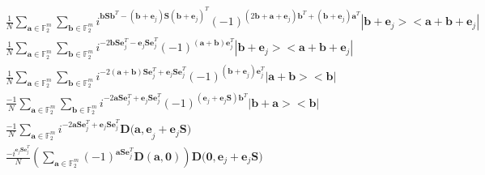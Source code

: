 \documentclass{article}
\begin{document}
\begin{enumerate}
		\begin{align}
			&\frac{1}{N}\sum_{\mathbf{a} \in \mathbb{F}^m_2}{\sum_{\mathbf{b} \in \mathbb{F}^m_2}{i^{\mathbf{b S b}^T -(\mathbf{b+e}_j)\mathbf{S}(\mathbf{b+e}_j)^T} (-1)^{(2\mathbf{b}+\mathbf{a+e}_j)\mathbf{b}^T+(\mathbf{b+e}_j)\mathbf{a}^T} |\mathbf{b+e}_j> <\mathbf{a+b+e}_j |    } }\nonumber \\
			&\frac{1}{N}\sum_{\mathbf{a} \in \mathbb{F}^m_2}{\sum_{\mathbf{b} \in \mathbb{F}^m_2}{i^{-2\mathbf{b S }\mathbf{e}_j^T-\mathbf{e}_j \mathbf{S e}_j^T} (-1)^{(\mathbf{a+b})\mathbf{e}_j^T} |\mathbf{b+e}_j> <\mathbf{a+b+e}_j |    } }\nonumber\\
			& \frac{1}{N}\sum_{\mathbf{a} \in \mathbb{F}^m_2}{\sum_{\mathbf{b} \in \mathbb{F}^m_2}{i^{-2\mathbf{(a+b) S }\mathbf{e}_j^T+\mathbf{e}_j \mathbf{S e}_j^T} (-1)^{(\mathbf{b+e}_j)\mathbf{e}_j^T} |\mathbf{a+b}> <\mathbf{b} |    } }\nonumber \\
			& \frac{-1}{N}\sum_{\mathbf{a} \in \mathbb{F}^m_2}{\sum_{\mathbf{b} \in \mathbb{F}^m_2}{i^{-2\mathbf{a S }\mathbf{e}_j^T+\mathbf{e}_j \mathbf{S e}_j^T} (-1)^{(\mathbf{e}_j+\mathbf{e}_j\mathbf{S})\mathbf{b}^T} |\mathbf{b+a}> <\mathbf{b} |    } } \nonumber \\
			& \frac{-1}{N}\sum_{\mathbf{a} \in \mathbb{F}^m_2}{i^{-2\mathbf{a S }\mathbf{e}_j^T+\mathbf{e}_j \mathbf{S e}_j^T} \mathbf{D(a,e}_j+\mathbf{e}_j\mathbf{S})} \nonumber\\
			& \frac{-i^{\mathbf{e}_j \mathbf{S e}_j^T}}{N} \left(\sum_{\mathbf{a} \in \mathbb{F}^m_2}{(-1)^{\mathbf{a S }\mathbf{e}_j^T} \mathbf{D(a,0)}} \right) \mathbf{D(0},\mathbf{e}_j+\mathbf{e}_j \mathbf{S}) \label{FinalRes}
		\end{align}
		\\
		

\end{enumerate}
\end{document}
